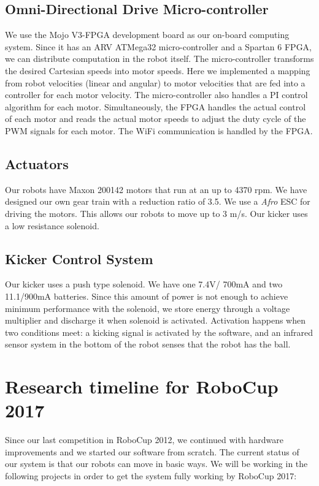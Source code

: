 \documentclass[]{llncs}
\begin{document}
\subsection{Omni-Directional Drive Micro-controller}
We use the Mojo V3-FPGA development board as our on-board computing system. Since it has an ARV ATMega32 micro-controller and a Spartan 6 FPGA, we can distribute computation in the robot itself. The micro-controller transforms the desired Cartesian speeds into motor speeds. Here we implemented a mapping from robot velocities (linear and angular) to motor velocities that are fed into a controller for each motor velocity. The micro-controller also handles a PI control algorithm for each motor. Simultaneously, the FPGA handles the actual control of each motor and reads the actual motor speeds to adjust the duty cycle of the PWM signals for each motor. The WiFi communication is handled by the FPGA. 


\subsection{Actuators}
Our robots have Maxon 200142 motors that run at an up to 4370 rpm. We have designed our own gear train with a reduction ratio of 3.5. We use a \textit{Afro} ESC for driving the motors. This allows our robots to move up to 3 m/s. Our kicker uses a low resistance solenoid.



\subsection{Kicker Control System}
Our kicker uses a push type solenoid. We have one 7.4V/ 700mA and two 11.1/900mA batteries. Since this amount of power is not enough to achieve minimum performance with the solenoid, we store energy through a voltage multiplier and discharge it when solenoid is activated. Activation happens when two conditions meet: a kicking signal is activated by the software, and an infrared sensor system in the bottom of the robot senses that the robot has the ball. 

\section{Research timeline for RoboCup 2017}
Since our last competition in RoboCup 2012, we continued with hardware improvements and we started our software from scratch. The current status of our system is that our robots can move in basic ways. We will be working in the following projects in order to get the system fully working by RoboCup 2017:
\end{document}
